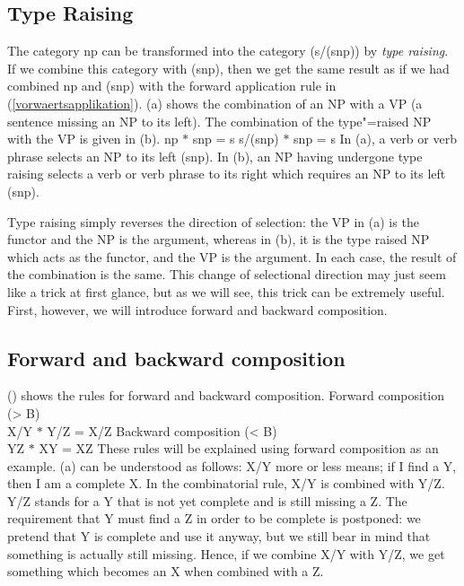\subsection{Type Raising}

\addlines[-1]
The category np can be transformed into the category (s/(s\bs np)) by \emph{type raising}. If we combine this category with (s\bs np), then we
get the same result as if we had combined np and (s\bs np) with the forward application rule in (\ref{vorwaertsapplikation}). (a) shows the combination of an NP
with a VP (a sentence missing an NP to its left). The combination of the type"=raised NP with the VP is given in (b).
\eal
\ex np $*$ s\bs np = s 
\ex s/(s\bs np) $*$ s\bs np = s
\zl
In (a), a verb or verb phrase selects an NP to its left (s\bs np). In (b), an NP having undergone type raising selects a verb or verb phrase to its right which requires
an NP to its left (s\bs np). 

Type raising simply reverses the direction of selection: the VP in (a) is the functor and the
NP is the argument, whereas in  (b), it is the type raised NP which acts as the functor,
and the VP is the argument. In each case, the result of the combination is the same. This change of selectional direction may just seem like a trick at first glance, but as we will see, this
trick can be extremely useful. First, however, we will introduce forward and backward composition.

\subsection{Forward and backward composition}
\label{Kategorialgrammatik-Komposition}

() shows the rules for forward and backward composition.
\eal
\ex\label{Regel-Vorwaertskomposition}
 Forward composition (> B)\\
    X/Y $*$ Y/Z = X/Z 
\ex Backward composition (< B)\\
    Y\bs Z $*$ X\bs Y = X\bs Z
\zl 
These rules will be explained using forward composition as an example. (a) can be understood as follows: X/Y more or less means; if I find a Y, then I am a complete X.
In the combinatorial rule, X/Y is combined with Y/Z. Y/Z stands for a Y that is not yet complete and is
still missing a Z. The requirement that Y must find a Z in order
to be complete is postponed: we pretend that Y is complete and use it anyway, but we still bear in mind that
something is actually still missing. Hence, if we combine X/Y with Y/Z, we get something which becomes an X when combined with a Z. 


